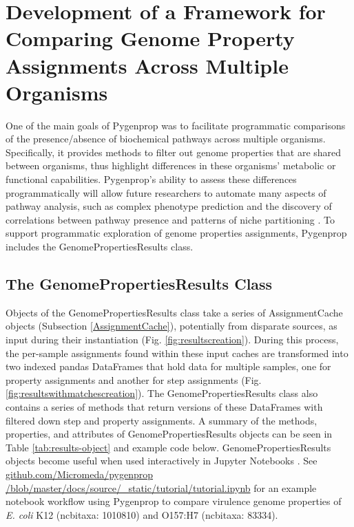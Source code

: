 \section{Development of a Framework for Comparing Genome Property Assignments Across Multiple Organisms} \label{GenomePropertiesResults}

One of the main goals of Pygenprop was to facilitate programmatic comparisons of the presence/absence of biochemical pathways across multiple organisms. Specifically, it provides methods to filter out genome properties that are shared between organisms, thus highlight differences in these organisms' metabolic or functional capabilities. Pygenprop's ability to assess these differences programmatically will allow future researchers to automate many aspects of pathway analysis, such as complex phenotype prediction and the discovery of correlations between pathway presence and patterns of niche partitioning \cite{finke2008niche}. To support programmatic exploration of genome properties assignments, Pygenprop includes the GenomePropertiesResults class. 

\subsection{The GenomePropertiesResults Class}

Objects of the GenomePropertiesResults class take a series of AssignmentCache objects (Subsection \ref{AssignmentCache}), potentially from disparate sources, as input during their instantiation (Fig. \ref{fig:resultscreation}). During this process, the per-sample assignments found within these input caches are transformed into two indexed pandas DataFrames \cite{mckinney2010data} that hold data for multiple samples, one for property assignments and another for step assignments (Fig. \ref{fig:resultswithmatchescreation}). The GenomePropertiesResults class also contains a series of methods that return versions of these DataFrames with filtered down step and property assignments. A summary of the methods, properties, and attributes of GenomePropertiesResults objects can be seen in Table \ref{tab:results-object} and example code below. GenomePropertiesResults objects become useful when used interactively in Jupyter Notebooks \cite{kluyver2016jupyter}. See \href{http://github.com/Micromeda/pygenprop/blob/master/docs/source/_static/tutorial/tutorial.ipynb}{github.com/Micromeda/pygenprop /blob/master/docs/source/\_static/tutorial/tutorial.ipynb} for an example notebook workflow using Pygenprop to compare virulence genome properties of \textit{E. coli} K12 (\gls{ncbitaxa}: 1010810) and O157:H7 (\gls{ncbitaxa}: 83334).

